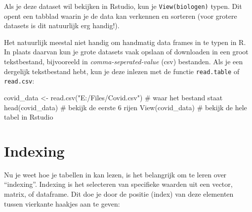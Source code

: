 \documentclass[
  a4paper,
]{scrbook}
\newenvironment{Shaded}{\begin{snugshade}}{\end{snugshade}}
\newcommand{\CommentTok}[1]{\textcolor[rgb]{0.37,0.37,0.37}{#1}}
\newcommand{\FunctionTok}[1]{\textcolor[rgb]{0.28,0.35,0.67}{#1}}
\newcommand{\NormalTok}[1]{\textcolor[rgb]{0.00,0.23,0.31}{#1}}
\newcommand{\OtherTok}[1]{\textcolor[rgb]{0.00,0.23,0.31}{#1}}
\newcommand{\StringTok}[1]{\textcolor[rgb]{0.13,0.47,0.30}{#1}}
\theoremstyle{definition}
\theoremstyle{remark}
\begin{document}
Als je deze dataset wil bekijken in Rstudio, kun je
\texttt{View(biologen)} typen. Dit opent een tabblad waarin je de data
kan verkennen en sorteren (voor grotere datasets is dit natuurlijk erg
handig!).

Het natuurlijk meestal niet handig om handmatig data frames in te typen
in R. In plaats daarvan kun je grote datasets vaak opslaan of downloaden
in een groot tekstbestand, bijvooreeld in \emph{comma-seperated-value}
(csv) bestanden. Als je een dergelijk tekstbestand hebt, kun je deze
inlezen met de functie \texttt{read.table} of \texttt{read.csv}:

\begin{Shaded}
\begin{Highlighting}[]
\NormalTok{covid\_data }\OtherTok{\textless{}{-}} \FunctionTok{read.csv}\NormalTok{(}\StringTok{"E:/Files/Covid.csv"}\NormalTok{) }\CommentTok{\# waar het bestand staat}
\FunctionTok{head}\NormalTok{(covid\_data) }\CommentTok{\# bekijk de eerste 6 rijen}
\FunctionTok{View}\NormalTok{(covid\_data) }\CommentTok{\# bekijk de hele tabel in Rstudio}
\end{Highlighting}
\end{Shaded}

\section{Indexing}\label{indexing}

Nu je weet hoe je tabellen in kan lezen, is het belangrijk om te leren
over ``indexing''. Indexing is het selecteren van specifieke waarden uit
een vector, matrix, of dataframe. Dit doe je door de positie (index) van
deze elementen tussen vierkante haakjes aan te geven:
\end{document}
